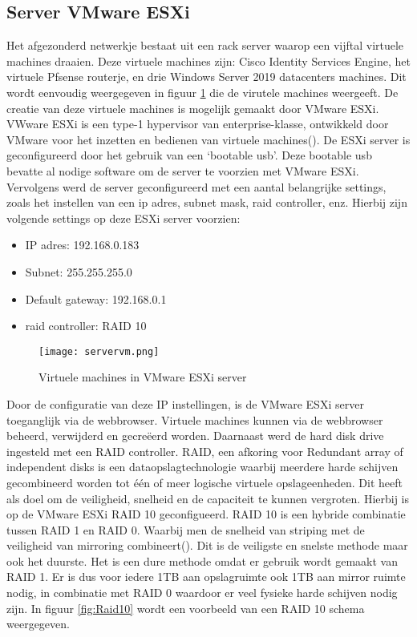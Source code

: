 \subsection{Server VMware ESXi}
Het afgezonderd netwerkje bestaat uit een rack server waarop een vijftal virtuele machines draaien. Deze virtuele machines zijn: Cisco Identity Services Engine, het virtuele Pfsense routerje, en drie Windows Server 2019 datacenters machines. Dit wordt eenvoudig weergegeven in figuur \ref{fig:vms} die de virutele machines weergeeft. De creatie van deze virtuele machines is mogelijk gemaakt door VMware ESXi.  VWware ESXi is een type-1 hypervisor van enterprise-klasse, ontwikkeld door VMware voor het inzetten en bedienen van virtuele machines(\cite{VMwareESXI}). 
\newline
\newline
De ESXi server is geconfigureerd door het gebruik van een ‘bootable usb’. Deze bootable usb bevatte al nodige software om de server te voorzien met VMware ESXi. Vervolgens werd de server geconfigureerd met een aantal belangrijke settings, zoals het instellen van een ip adres, subnet mask, raid controller, enz. Hierbij zijn volgende settings op deze ESXi server voorzien: 

\begin{itemize}
	\item IP adres: 192.168.0.183
	\item Subnet: 255.255.255.0
	\item Default gateway: 192.168.0.1
	\item raid controller: RAID 10
\end{itemize}

\begin{figure}[H]
	\centering
	\texttt{[image: servervm.png]}
	\caption{Virtuele machines in VMware ESXi server}
	\label{fig:vms}
\end{figure}

\newpage
Door de configuratie van deze IP instellingen, is de VMware ESXi server toeganglijk via de webbrowser. Virtuele machines kunnen via de webbrowser beheerd, verwijderd en gecreëerd worden. Daarnaast werd de hard disk drive ingesteld met een RAID controller. RAID, een afkoring voor Redundant array of independent disks is een dataopslagtechnologie waarbij meerdere harde schijven gecombineerd worden tot één of meer logische virtuele opslageenheden. Dit heeft als doel om de veiligheid, snelheid en de capaciteit te kunnen vergroten. Hierbij is op de VMware ESXi RAID 10 geconfigueerd. RAID 10 is een hybride combinatie tussen RAID 1 en RAID 0. Waarbij men de snelheid van striping met de veiligheid van mirroring combineert(\cite{RAIDLi}). 
\newline
\newline
Dit is de veiligste en snelste methode maar ook het duurste. Het is een dure methode omdat er gebruik wordt gemaakt van RAID 1. Er is dus voor iedere 1TB aan opslagruimte ook 1TB aan mirror ruimte nodig, in combinatie met RAID 0 waardoor er veel fysieke harde schijven nodig zijn. In figuur \ref{fig:Raid10} wordt een voorbeeld van een RAID 10 schema weergegeven.

